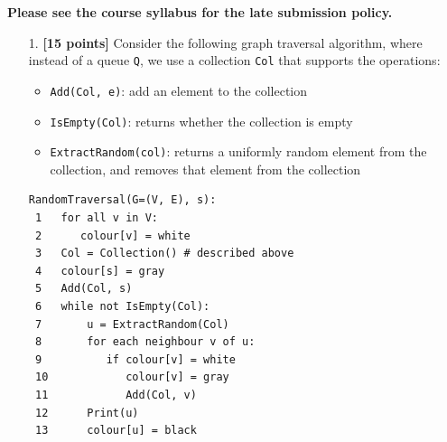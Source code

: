 \documentclass{assignment-263}
\begin{document}
\think

\textbf{Please see the course syllabus for the late submission policy.}

\begin{enumerate}
\item[1.]  \textbf{[15 points]} Consider the following graph traversal algorithm,
    where instead of a queue \verb|Q|,
    we use a collection \verb|Col| that supports the operations:
    \begin{itemize}
        \item \verb|Add(Col, e)|: add an element to the collection
        \item \verb|IsEmpty(Col)|: returns whether the collection is empty
        \item \verb|ExtractRandom(col)|: returns a uniformly random element from the collection, and removes that element from the collection
    \end{itemize}

\begin{verbatim}
RandomTraversal(G=(V, E), s):
 1   for all v in V:
 2      colour[v] = white
 3   Col = Collection() # described above
 4   colour[s] = gray
 5   Add(Col, s)
 6   while not IsEmpty(Col):
 7       u = ExtractRandom(Col)
 8       for each neighbour v of u:
 9          if colour[v] = white
 10            colour[v] = gray
 11            Add(Col, v)
 12      Print(u)
 13      colour[u] = black
\end{verbatim}


\end{enumerate}
\end{document}
